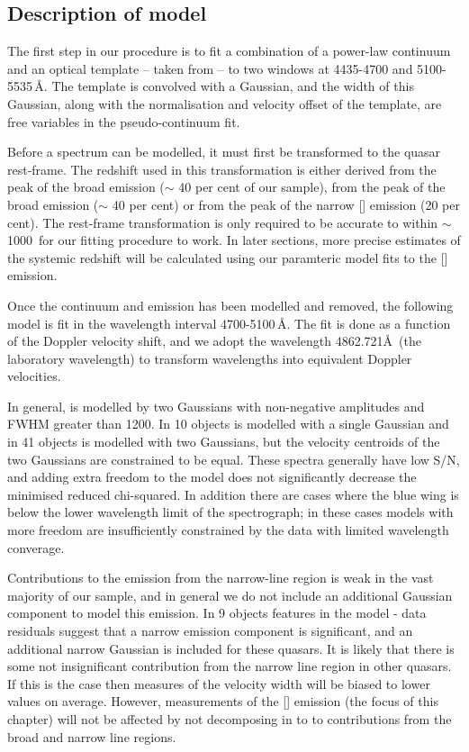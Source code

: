 \subsection{Description of model}

The first step in our procedure is to fit a combination of a power-law continuum and an optical  template -- taken from \citet{boroson92} -- to two windows at 4435-4700 and 5100-5535\,\AA.
The  template is convolved with a Gaussian, and the width of this Gaussian, along with the normalisation and velocity offset of the  template, are free variables in the pseudo-continuum fit.

Before a spectrum can be modelled, it must first be transformed to the quasar rest-frame.  
The redshift used in this transformation is either derived from the peak of the broad \ha emission ($\sim$ 40 per cent of our sample), from the peak of the broad \hb emission ($\sim$ 40 per cent) or from the peak of the narrow [] emission (20 per cent).
The rest-frame transformation is only required to be accurate to within $\sim$1000\kms\, for our fitting procedure to work. 
In later sections, more precise estimates of the systemic redshift will be calculated using our paramteric model fits to the [] emission. 

Once the continuum and  emission has been modelled and removed, the following model is fit in the wavelength interval 4700-5100\,\AA.
The fit is done as a function of the Doppler velocity shift, and we adopt the wavelength 4862.721\AA\, (the laboratory \hb wavelength) to transform wavelengths into equivalent Doppler velocities.

In general, \hb is modelled by two Gaussians with non-negative amplitudes and FWHM greater than 1200\kms.
In 10 objects \hb is modelled with a single Gaussian and in 41 objects \hb is modelled with two Gaussians, but the velocity centroids of the two Gaussians are constrained to be equal. 
These spectra generally have low \ac{S/N}, and adding extra freedom to the model does not significantly decrease the minimised reduced chi-squared.
In addition there are cases where the blue wing is below the lower wavelength limit of the spectrograph; in these cases models with more freedom are insufficiently constrained by the data with limited wavelength converage. 

Contributions to the \hb emission from the narrow-line region is weak in the vast majority of our sample, and in general we do not include an additional Gaussian component to model this emission. 
In 9 objects features in the model - data residuals suggest that a narrow emission component is significant, and an additional narrow Gaussian is included for these quasars. 
It is likely that there is some not insignificant contribution from the narrow line region in other quasars. 
If this is the case then measures of the \hb velocity width will be biased to lower values on average. 
However, measurements of the [] emission (the focus of this chapter) will not be affected by not decomposing \hb in to to contributions from the broad and narrow line regions.  

